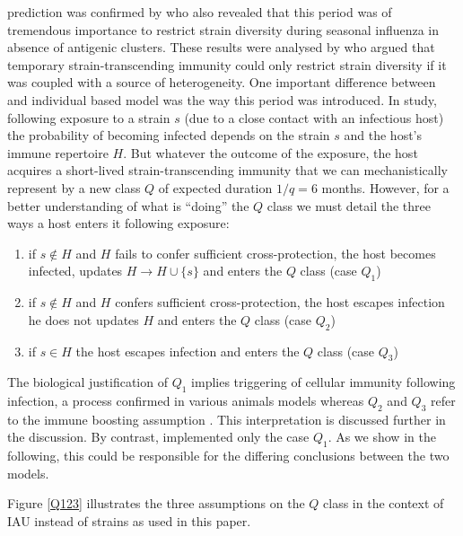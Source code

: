 \citet{Webster1992} prediction was confirmed by \citet{Ferguson2003}
who also revealed that this period was of tremendous importance to
restrict strain diversity during seasonal influenza in absence of
antigenic clusters. These results were analysed by \citet{Tria2005}
who argued that temporary strain-transcending immunity could only
restrict strain diversity if it was coupled with a source of
heterogeneity. One important difference between \citet{Ferguson2003}
and \citet{Tria2005} individual based model was the way this period
was introduced. In \citet{Ferguson2003} study, following exposure to a
strain $s$ (due to a close contact with an infectious host) the
probability of becoming infected depends on the strain $s$ and the
host's immune repertoire $H$. But whatever the outcome of the
exposure, the host acquires a short-lived strain-transcending immunity
that we can mechanistically represent by a new class $Q$ of expected
duration $1/q=6$ months. However, for a better understanding of what
is ``doing'' the $Q$ class we must detail the three ways a host enters
it following exposure:
\begin{enumerate}
\item if $s\notin H$ and $H$ fails to confer sufficient
  cross-protection, the host becomes infected, updates $H\rightarrow
  H\cup\{s\}$ and enters the $Q$ class (case $Q_{1}$)
\item if $s\notin H$ and $H$ confers sufficient cross-protection, the
  host escapes infection he does not updates $H$ and enters the $Q$
  class (case $Q_{2}$)
\item if $s\in H$ the host escapes infection and enters the $Q$ class
  (case $Q_{3}$)
\end{enumerate}

The biological justification of $Q_{1}$ implies triggering of cellular
immunity following infection, a process confirmed in various animals
models \citep{Grebe2008} whereas $Q_{2}$ and $Q_{3}$ refer to the
immune boosting assumption \citep{Ferguson2003}. This interpretation
is discussed further in the discussion. By contrast,
\citet{Tria2005} implemented only the case $Q_{1}$. As we show in
the following, this could be responsible for the differing conclusions
between the two models.

Figure \ref{Q123} illustrates the three assumptions on the $Q$ class
in the context of IAU instead of strains as used in this paper.

